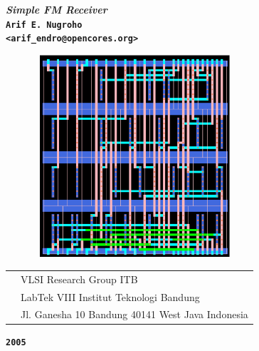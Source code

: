\documentclass[a4paper,10pt]{article}
\begin{document}
\thispagestyle{empty}
\begin{center}
\Huge \textbf {\textit{Simple FM Receiver}}\\
\vspace{3.0cm}
\large \textbf {\texttt{Arif E. Nugroho \\<arif\_endro@opencores.org>}}
\vspace{3.0cm}
\end{center}

\begin{figure}[H]
\center
\includegraphics[width=7.5cm,height=7.5cm]{fm_cores.eps}
\end{figure}

\vspace{0.50cm}
\begin{tabular}{p{3.0cm}p{10cm}}
		& VLSI Research Group ITB\\
		& LabTek VIII Institut Teknologi Bandung\\
		& Jl. Ganesha 10 Bandung 40141 West Java Indonesia\\
\end{tabular}


\vspace{1.00cm}
\begin{center}

\Large \textbf{\texttt{2005}}
\end{center}

\newpage

\tableofcontents
\newpage

\listoffigures
\newpage
{}
\setcounter{figure}{0}
\end{document}
